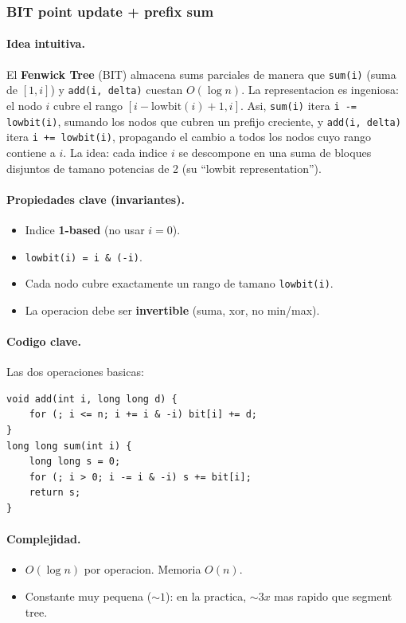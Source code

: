 \subsubsection{BIT point update + prefix sum}

\paragraph{Idea intuitiva.}
El \textbf{Fenwick Tree} (BIT) almacena sums parciales de manera que \texttt{sum(i)} (suma de $[1, i]$) y \texttt{add(i, delta)} cuestan $O(\log n)$. La representacion es ingeniosa: el nodo $i$ cubre el rango $[i - \text{lowbit}(i) + 1, i]$. Asi, \texttt{sum(i)} itera \texttt{i -= lowbit(i)}, sumando los nodos que cubren un prefijo creciente, y \texttt{add(i, delta)} itera \texttt{i += lowbit(i)}, propagando el cambio a todos los nodos cuyo rango contiene a $i$. La idea: cada indice $i$ se descompone en una suma de bloques disjuntos de tamano potencias de 2 (su ``lowbit representation'').

\paragraph{Propiedades clave (invariantes).}
\begin{itemize}\setlength\itemsep{0pt}
	\item Indice \textbf{1-based} (no usar $i=0$).
	\item \texttt{lowbit(i) = i \& (-i)}.
	\item Cada nodo cubre exactamente un rango de tamano \texttt{lowbit(i)}.
	\item La operacion debe ser \textbf{invertible} (suma, xor, no min/max).
\end{itemize}

\paragraph{Codigo clave.}
Las dos operaciones basicas:
\begin{verbatim}
void add(int i, long long d) {
    for (; i <= n; i += i & -i) bit[i] += d;
}
long long sum(int i) {
    long long s = 0;
    for (; i > 0; i -= i & -i) s += bit[i];
    return s;
}
\end{verbatim}

\paragraph{Complejidad.}
\begin{itemize}\setlength\itemsep{0pt}
	\item $O(\log n)$ por operacion. Memoria $O(n)$.
	\item Constante muy pequena ($\sim 1$): en la practica, $\sim 3x$ mas rapido que segment tree.
\end{itemize}

